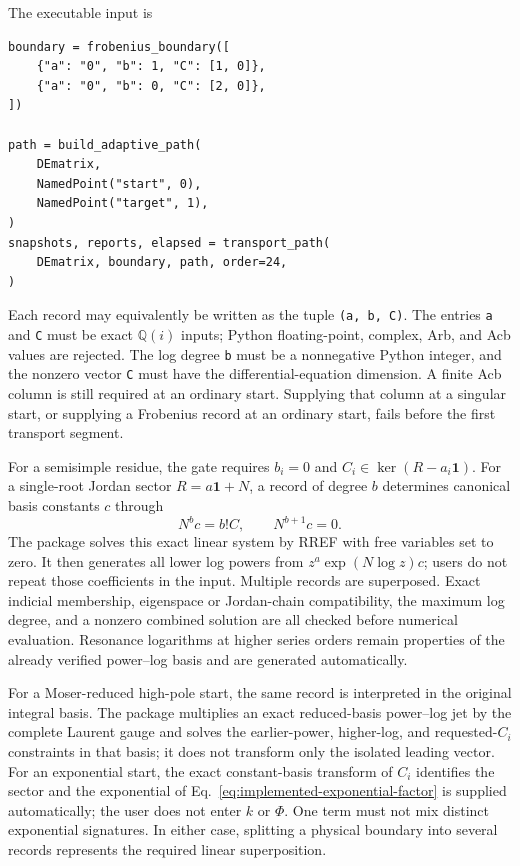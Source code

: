 \documentclass[11pt]{article}
\newcommand{\Id}{\mathbf 1}
\begin{document}
The executable input is
\begin{verbatim}
boundary = frobenius_boundary([
    {"a": "0", "b": 1, "C": [1, 0]},
    {"a": "0", "b": 0, "C": [2, 0]},
])

path = build_adaptive_path(
    DEmatrix,
    NamedPoint("start", 0),
    NamedPoint("target", 1),
)
snapshots, reports, elapsed = transport_path(
    DEmatrix, boundary, path, order=24,
)
\end{verbatim}
Each record may equivalently be written as the tuple \texttt{(a, b, C)}.  The entries
\texttt{a} and \texttt{C} must be exact $\mathbb Q(i)$ inputs; Python floating-point,
complex, Arb, and Acb values are rejected.  The log degree \texttt{b} must be a nonnegative
Python integer, and the nonzero vector \texttt{C} must have the differential-equation
dimension.  A finite Acb column is still required at an ordinary start.  Supplying that
column at a singular start, or supplying a Frobenius record at an ordinary start, fails
before the first transport segment.

For a semisimple residue, the gate requires $b_i=0$ and
$C_i\in\ker(R-a_i\Id)$.  For a single-root Jordan sector
$R=a\Id+N$, a record of degree $b$ determines canonical basis constants $c$ through
\begin{equation}
  N^b c=b!C,
  \qquad N^{b+1}c=0.
  \label{eq:frobenius-boundary-jordan-recovery}
\end{equation}
The package solves this exact linear system by RREF with free variables set to zero.  It
then generates all lower log powers from $z^a\exp(N\log z)c$; users do not repeat those
coefficients in the input.  Multiple records are superposed.  Exact indicial membership,
eigenspace or Jordan-chain compatibility, the maximum log degree, and a nonzero combined
solution are all checked before numerical evaluation.  Resonance logarithms at higher
series orders remain properties of the already verified power--log basis and are generated
automatically.

For a Moser-reduced high-pole start, the same record is interpreted in the original integral
basis.  The package multiplies an exact reduced-basis power--log jet by the complete Laurent
gauge and solves the earlier-power, higher-log, and requested-$C_i$ constraints in that basis;
it does not transform only the isolated leading vector.  For an exponential start, the exact constant-basis transform of $C_i$ identifies
the sector and the exponential of Eq.~\eqref{eq:implemented-exponential-factor} is supplied
automatically; the user does not enter $k$ or $\Phi$.  One term must not mix distinct
exponential signatures.  In either case, splitting a physical boundary into several records
represents the required linear superposition.
\end{document}
